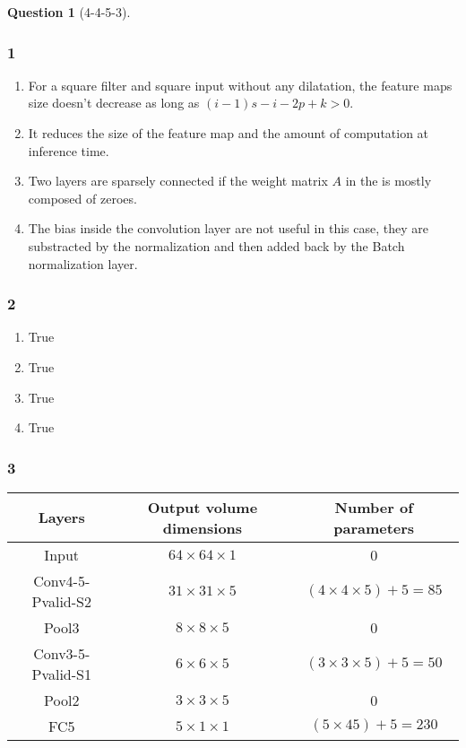 \documentclass[12pt]{article}
\theoremstyle{definition}
\newtheorem{exercise}{Question}%
\begin{document}
\begin{exercise}[4-4-5-3]
{\subsubsection*{1}
\begin{enumerate}[label=(\alph*)]
 \item For a square filter and square input without any dilatation, the feature maps
        size doesn't decrease as long as $(i-1)s -i -2p + k > 0$.
 \item It reduces the size of the feature map and the amount of computation at
        inference time.
 \item Two layers are sparsely connected if the weight matrix $A$ in the is mostly
composed of zeroes.
 \item The bias inside the convolution layer are not useful in this case, they are
substracted by the normalization and then added back by the Batch normalization
layer.
\end{enumerate}
\subsubsection*{2}
\begin{enumerate}[label=(\alph*)]
\item True
\item True
\item True
\item True
\end{enumerate}
\subsubsection*{3}

    \begin{center}
    \begin{tabular}{| c | c | c |}
     \hline
     Layers & Output volume dimensions & Number of parameters \\ [0.5ex]
     \hline
     Input & $64 \times 64 \times 1$ & 0  \\
     \hline
     Conv4-5-Pvalid-S2 & $31 \times 31 \times 5$  & $(4 \times 4 \times 5) + 5 = 85$ \\
     \hline
     Pool3 & $8 \times 8 \times 5$ &  0 \\
     \hline
     Conv3-5-Pvalid-S1 & $6 \times 6 \times 5$ & $(3 \times 3 \times 5) + 5 = 50$ \\
     \hline
     Pool2 & $3 \times 3 \times 5$ &  0 \\ [1ex]
     \hline
     FC5 & $5 \times 1 \times 1$ & $  (5 \times 45) + 5 = 230$ \\ [1ex]
     \hline
    \end{tabular}
    \end{center}
}
\end{exercise}
\end{document}
